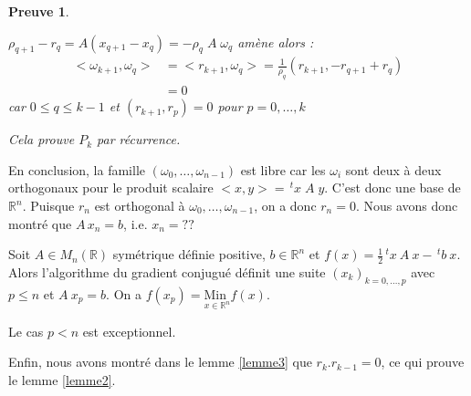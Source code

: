 \documentclass[a4paper,11pt]{article}
\newcommand{\R}{\mathbb{R}}
\newcommand{\tpo}[1]{\,^t#1}
\newcommand{\MinI}[1]{\underset{#1}{\text{Min }}}
\theoremstyle{plain} %
\newtheorem{preuve}{Preuve}
\begin{document}
\begin{preuve}
\begin{enumerate}[label=•]
            \vspace{0.4cm}
            $\rho_{q+1} - r_q = A(x_{q+1}-x_q) = - \rho_q \; A \; \omega_q$ amène alors :
            \begin{align*}
                <\omega_{k+1},\omega_q> & = <r_{k+1}, \omega_q> = \frac{1}{\rho_q}(r_{k+1},-r_{q+1}+r_q) \\
                & = 0
            \end{align*}
            car $0 \leq q \leq k-1$ et $(r_{k+1},r_p) = 0$ pour $p = 0,\dots,k$

            Cela prouve $P_k$ par récurrence.
    \end{enumerate}
\end{preuve}

En conclusion, la famille $(\omega_0, \dots, \omega_{n-1})$ est libre car les $\omega_i$ sont
deux à deux orthogonaux pour le produit scalaire $<x,y> = \tpo x \; A \; y$. C'est donc une
base de $\R^n$. Puisque $r_n$ est orthogonal à $\omega_0, \dots, \omega_{n-1}$, on a donc
$r_n=0$. Nous avons donc montré que $A \, x_n = b$, i.e. $x_n=??$

\begin{ftheo}
    Soit $A \in M_n(\R)$ symétrique définie positive, $b \in \R^n$ et ${f(x) = \frac{1}{2} \tpo x \: A \: x - \tpo b \: x}$.
    Alors l'algorithme du gradient conjugué définit une suite $(x_k)_{k=0,\dots,p}$ avec
    $p \leq n$ et $A \: x_p = b$. On a $f(x_p) = \MinI{x \in \R^n} f(x)$.
\end{ftheo}

\begin{remark}
    Le cas $p<n$ est exceptionnel.
\end{remark}

Enfin, nous avons montré dans le lemme \ref{lemme3} que $r_k.r_{k-1}=0$, ce qui prouve le lemme
\ref{lemme2}.
\end{document}
